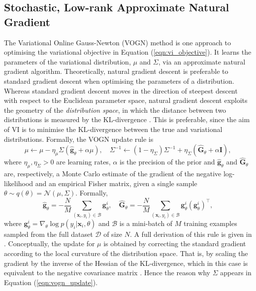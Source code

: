 \documentclass[msc,deptreport.inf]{infthesis} %
\newcommand{\matr}[1]{\mathbf{#1}}
\begin{document}
\subsection{Stochastic, Low-rank Approximate Natural Gradient}\label{sec:slang}

The Variational Online Gauss-Newton (VOGN) method \cite{tangkaratt2018} is one approach to optimising the variational objective in Equation (\ref{eqn:vi_objective}). It learns the parameters of the variational distribution, $\mu$ and $\Sigma$, via an approximate natural gradient algorithm. Theoretically, natural gradient descent is preferable to standard gradient descent when optimising the parameters of a distribution. Whereas standard gradient descent moves in the direction of steepest descent with respect to the Euclidean parameter space, natural gradient descent exploits the geometry of the \emph{distribution space}, in which the distance between two distributions is measured by the KL-divergence \cite{pascanu2013}. This is preferable, since the aim of VI is to minimise the KL-divergence between the true and variational distributions. Formally, the VOGN update rule is 
\begin{equation}\label{eqn:vogn_update}
	\mu \leftarrow \mu - \eta_\mu \Sigma (\hat{\matr{g}}_\theta + \alpha \mu), \quad 
	\Sigma^{-1} \leftarrow (1 - \eta_\Sigma) \Sigma^{-1} + \eta_\Sigma(\hat{\matr{G}}_\theta + \alpha \matr{I}),
\end{equation}
where $\eta_\mu, \eta_\Sigma > 0$ are learning rates, $\alpha$ is the precision of the prior and $\hat{\matr{g}}_\theta$ and $\hat{\matr{G}}_\theta$ are, respectively, a Monte Carlo estimate of the gradient of the negative log-likelihood and an empirical Fisher matrix, given a single sample $\theta \sim q(\theta) = \mathcal{N}(\mu, \Sigma)$. Formally, 
\begin{equation}\label{eqn:slang_g_and_G}
	\hat{\matr{g}}_\theta = -\frac{N}{M} \sum_{(\matr{x}_i, y_i) \in \mathcal{B}} \matr{g}_\theta^i, \quad
	\hat{\matr{G}}_\theta = -\frac{N}{M} \sum_{(\matr{x}_i, y_i) \in \mathcal{B}} \matr{g}_\theta^i (\matr{g}_\theta^i)^\intercal,
\end{equation}
where $\matr{g}_\theta^i = \nabla_\theta \log p(y_i | \matr{x}_i, \theta)$ and $\mathcal{B}$ is a mini-batch of $M$ training examples sampled from the full dataset $\mathcal{D}$ of size $N$. A full derivation of this rule is given in \cite{tangkaratt2018}. Conceptually, the update for $\mu$ is obtained by correcting the standard gradient according to the local curvature of the distribution space. That is, by scaling the gradient by the inverse of the Hessian of the KL-divergence, which in this case is equivalent to the negative covariance matrix \cite{pascanu2013, opper2009}. Hence the reason why $\Sigma$ appears in Equation (\ref{eqn:vogn_update}).
\end{document}
